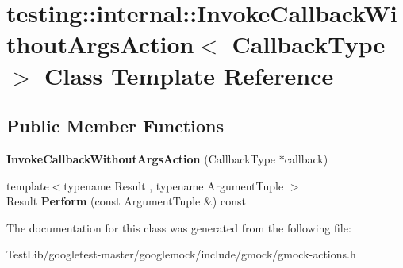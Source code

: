 \hypertarget{classtesting_1_1internal_1_1InvokeCallbackWithoutArgsAction}{}\section{testing\+:\+:internal\+:\+:Invoke\+Callback\+Without\+Args\+Action$<$ Callback\+Type $>$ Class Template Reference}
\label{classtesting_1_1internal_1_1InvokeCallbackWithoutArgsAction}
\subsection*{Public Member Functions}
\begin{DoxyCompactItemize}
\item 
\mbox{\label{classtesting_1_1internal_1_1InvokeCallbackWithoutArgsAction_a333d0b92596759753cf78dc98ee7e270}} 
{\bfseries Invoke\+Callback\+Without\+Args\+Action} (Callback\+Type $\ast$callback)
\item 
\mbox{\label{classtesting_1_1internal_1_1InvokeCallbackWithoutArgsAction_ac43b186c6daa5f21c8377678c6a9d4ba}} 
{\footnotesize template$<$typename Result , typename Argument\+Tuple $>$ }\\Result {\bfseries Perform} (const Argument\+Tuple \&) const
\end{DoxyCompactItemize}


The documentation for this class was generated from the following file\+:\begin{DoxyCompactItemize}
\item 
Test\+Lib/googletest-\/master/googlemock/include/gmock/gmock-\/actions.\+h\end{DoxyCompactItemize}
